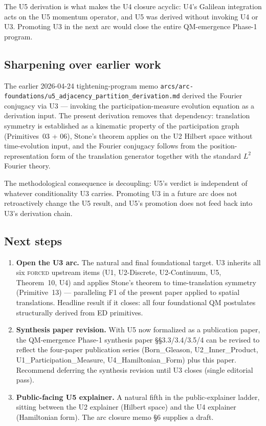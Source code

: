 \documentclass[11pt,a4paper]{article}
\begin{document}
The U5 derivation is what makes the U4 closure acyclic: U4's Galilean integration acts on the U5 momentum operator, and U5 was derived without invoking U4 or U3. Promoting U3 in the next arc would close the entire QM-emergence Phase-1 program.

\subsection{Sharpening over earlier work}

The earlier 2026-04-24 tightening-program memo \texttt{arcs/arc-foundations/u5\_adjacency\_partition\_derivation.md} derived the Fourier conjugacy via U3 --- invoking the participation-measure evolution equation as a derivation input. The present derivation removes that dependency: translation symmetry is established as a kinematic property of the participation graph (Primitives~03 + 06), Stone's theorem applies on the U2 Hilbert space without time-evolution input, and the Fourier conjugacy follows from the position-representation form of the translation generator together with the standard $L^2$ Fourier theory.

The methodological consequence is decoupling: U5's verdict is independent of whatever conditionality U3 carries. Promoting U3 in a future arc does not retroactively change the U5 result, and U5's promotion does not feed back into U3's derivation chain.

\subsection{Next steps}

\begin{enumerate}
  \item \textbf{Open the U3 arc.} The natural and final foundational target. U3 inherits all six \textsc{forced} upstream items (U1, U2-Discrete, U2-Continuum, U5, Theorem~10, U4) and applies Stone's theorem to time-translation symmetry (Primitive~13) --- paralleling F1 of the present paper applied to spatial translations. Headline result if it closes: all four foundational QM postulates structurally derived from ED primitives.
  \item \textbf{Synthesis paper revision.} With U5 now formalized as a publication paper, the QM-emergence Phase-1 synthesis paper \S\S3.3/3.4/3.5/4 can be revised to reflect the four-paper publication series (Born\_Gleason, U2\_Inner\_Product, U1\_Participation\_Measure, U4\_Hamiltonian\_Form) plus this paper. Recommend deferring the synthesis revision until U3 closes (single editorial pass).
  \item \textbf{Public-facing U5 explainer.} A natural fifth in the public-explainer ladder, sitting between the U2 explainer (Hilbert space) and the U4 explainer (Hamiltonian form). The arc closure memo \S6 supplies a draft.
\end{enumerate}
\end{document}
